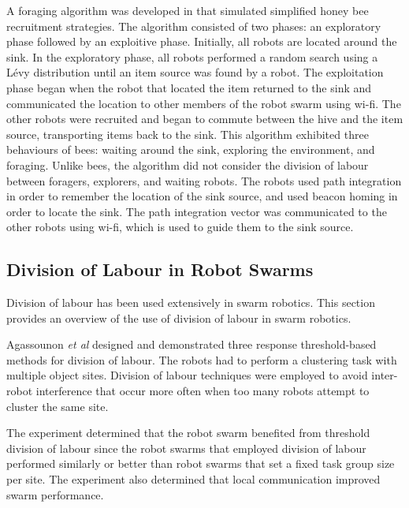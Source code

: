 \documentclass[preprint,12pt]{elsarticle}
\begin{document}
A foraging algorithm was developed in \cite{alers2014biologically} that simulated simplified honey bee recruitment strategies. The algorithm consisted of two phases: an exploratory phase followed by an exploitive phase. Initially, all robots are located around the sink. In the exploratory phase, all robots performed a random search using a L\'evy distribution until an item source was found by a robot. The exploitation phase began when the robot that located the item returned to the sink and communicated the location to other members of the robot swarm using wi-fi. The other robots were recruited and began to commute between the hive and the item source, transporting items back to the sink. This algorithm exhibited three behaviours of bees: waiting around the sink, exploring the environment, and foraging. Unlike bees, the algorithm did not consider the division of labour between foragers, explorers, and waiting robots. The robots used path integration in order to remember the location of the sink source, and used beacon homing in order to locate the sink. The path integration vector was communicated to the other robots using wi-fi, which is used to guide them to the sink source. 

\subsection{Division of Labour in Robot Swarms}
\label{background:divisionoflabour:robotswarm}
Division of labour has been used extensively in swarm robotics. This section provides an overview of the use of division of labour in swarm robotics.

Agassounon \textit{et al} \cite{agassounon2002efficiency} designed and demonstrated three response threshold-based methods for division of labour. The robots had to perform a clustering task with multiple object sites. Division of labour techniques were employed to avoid inter-robot interference that occur more often when too many robots attempt to cluster the same site. 

The experiment determined that the robot swarm benefited from threshold division of labour since the robot swarms that employed division of labour performed similarly or better than robot swarms that set a fixed task group size per site. The experiment also determined that local communication improved swarm performance.
\end{document}

